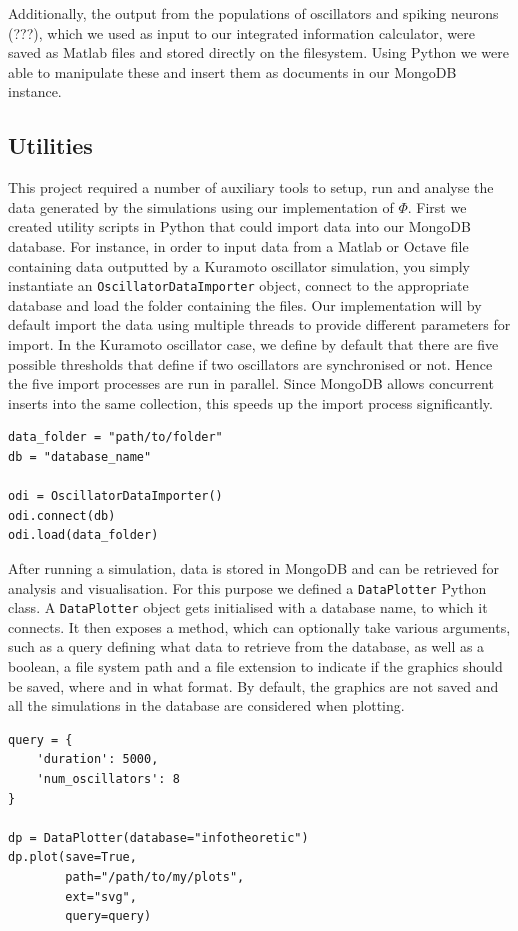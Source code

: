 \documentclass[a4paper,11pt]{article}
\begin{document}
Additionally, the output from the populations of oscillators and spiking neurons (???), which we used as input to our integrated information calculator, were saved as Matlab files and stored directly on the filesystem. Using Python we were able to manipulate these and insert them as documents in our MongoDB instance. 

\subsection{Utilities}
\label{sec:utils}
This project required a number of auxiliary tools to setup, run and analyse the data generated by the simulations using our implementation of $\Phi$. First we created utility scripts in Python that could import data into our MongoDB database. For instance, in order to input data from a Matlab or Octave file containing data outputted by a Kuramoto oscillator simulation, you simply instantiate an \texttt{OscillatorDataImporter} object, connect to the appropriate database and load the folder containing the files. Our implementation will by default import the data using multiple threads to provide different parameters for import. In the Kuramoto oscillator case, we define by default that there are five possible thresholds that define if two oscillators are synchronised or not. Hence the five import processes are run in parallel. Since MongoDB allows concurrent inserts into the same collection, this speeds up the import process significantly.

\begin{verbatim}
data_folder = "path/to/folder"
db = "database_name"

odi = OscillatorDataImporter()
odi.connect(db)
odi.load(data_folder)
\end{verbatim}

After running a simulation, data is stored in MongoDB and can be retrieved for analysis and visualisation. For this purpose we defined a \texttt{DataPlotter} Python class. A \texttt{DataPlotter} object gets initialised with a database name, to which it connects. It then exposes a  method, which can optionally take various arguments, such as a query defining what data to retrieve from the database, as well as a boolean, a file system path and a file extension to indicate if the graphics should be saved, where and in what format. By default, the graphics are not saved and all the simulations in the database are considered when plotting.

\begin{verbatim}
query = {
	'duration': 5000,
	'num_oscillators': 8        
}

dp = DataPlotter(database="infotheoretic")
dp.plot(save=True,
        path="/path/to/my/plots",
        ext="svg",
        query=query)
\end{verbatim}
\end{document}
